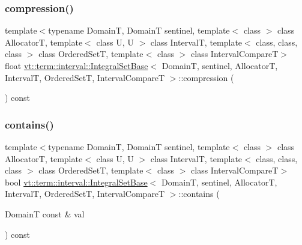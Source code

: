 \mbox{\label{structvt_1_1term_1_1interval_1_1_integral_set_base_a1897d55d5f300ad209d2ce014240680d}} 
\subsubsection{\texorpdfstring{compression()}{compression()}}
{\footnotesize\ttfamily template$<$typename DomainT, DomainT sentinel, template$<$ class $>$ class AllocatorT, template$<$ class U, U $>$ class IntervalT, template$<$ class, class, class $>$ class Ordered\+SetT, template$<$ class $>$ class Interval\+CompareT$>$ \\
float \hyperlink{structvt_1_1term_1_1interval_1_1_integral_set_base}{vt\+::term\+::interval\+::\+Integral\+Set\+Base}$<$ DomainT, sentinel, AllocatorT, IntervalT, Ordered\+SetT, Interval\+CompareT $>$\+::compression (\begin{DoxyParamCaption}{ }\end{DoxyParamCaption}) const\hspace{0.3cm}{\ttfamily [inline]}}

\mbox{\label{structvt_1_1term_1_1interval_1_1_integral_set_base_aa44021f10057190693c22777749fc8c4}} 
\subsubsection{\texorpdfstring{contains()}{contains()}}
{\footnotesize\ttfamily template$<$typename DomainT, DomainT sentinel, template$<$ class $>$ class AllocatorT, template$<$ class U, U $>$ class IntervalT, template$<$ class, class, class $>$ class Ordered\+SetT, template$<$ class $>$ class Interval\+CompareT$>$ \\
bool \hyperlink{structvt_1_1term_1_1interval_1_1_integral_set_base}{vt\+::term\+::interval\+::\+Integral\+Set\+Base}$<$ DomainT, sentinel, AllocatorT, IntervalT, Ordered\+SetT, Interval\+CompareT $>$\+::contains (\begin{DoxyParamCaption}\item[{DomainT const \&}]{val }\end{DoxyParamCaption}) const\hspace{0.3cm}{\ttfamily [inline]}}

